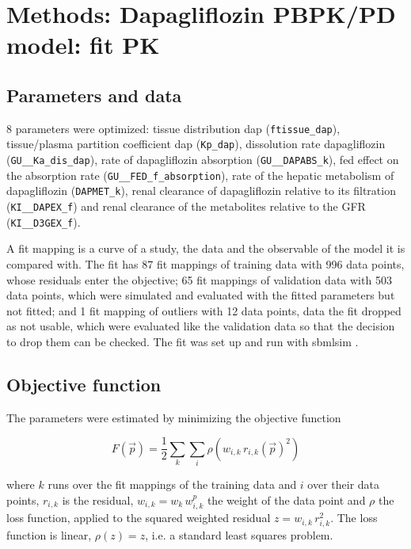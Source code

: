 \section{Methods: Dapagliflozin PBPK/PD model: fit PK}

\subsection{Parameters and data}

8 parameters were optimized: tissue distribution dap (\texttt{ftissue\_dap}), tissue/plasma partition coefficient dap (\texttt{Kp\_dap}), dissolution rate dapagliflozin (\texttt{GU\_\_Ka\_dis\_dap}), rate of dapagliflozin absorption (\texttt{GU\_\_DAPABS\_k}), fed effect on the absorption rate (\texttt{GU\_\_FED\_f\_absorption}), rate of the hepatic metabolism of dapagliflozin (\texttt{DAPMET\_k}), renal clearance of dapagliflozin relative to its filtration (\texttt{KI\_\_DAPEX\_f}) and renal clearance of the metabolites relative to the GFR (\texttt{KI\_\_D3GEX\_f}).

A fit mapping is a curve of a study, the data and the observable of the model it is compared with. The fit has 87 fit mappings of training data with 996 data points, whose residuals enter the objective; 65 fit mappings of validation data with 503 data points, which were simulated and evaluated with the fitted parameters but not fitted; and 1 fit mapping of outliers with 12 data points, data the fit dropped as not usable, which were evaluated like the validation data so that the decision to drop them can be checked. The fit was set up and run with sbmlsim \cite{Koenig2026_sbmlsim}.

\subsection{Objective function}

The parameters were estimated by minimizing the objective function

\begin{equation}
F(\vec{p}) = \frac{1}{2} \sum_{k} \sum_{i} \rho\left(w_{i,k}\, r_{i,k}(\vec{p})^2\right)
\end{equation}

where $k$ runs over the fit mappings of the training data and $i$ over their data points, $r_{i,k}$ is the residual, $w_{i,k} = w_k\, w^{p}_{i,k}$ the weight of the data point and $\rho$ the loss function, applied to the squared weighted residual $z = w_{i,k}\, r_{i,k}^2$. The loss function is linear, $\rho(z) = z$, i.e. a standard least squares problem.

